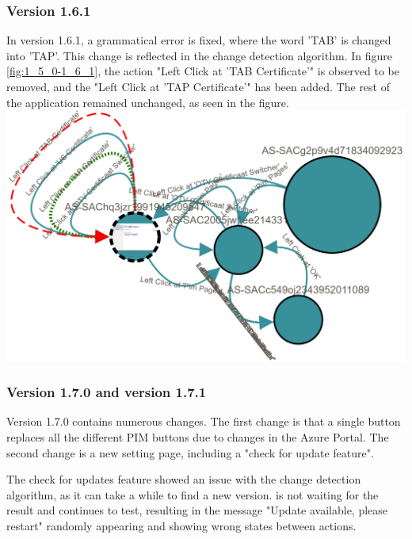 \subsubsection{Version 1.6.1}
In version 1.6.1, a grammatical error is fixed, where the word 'TAB' is changed into 'TAP'. This change is reflected in the change detection algorithm. In figure \ref{fig:1_5_0-1_6_1}, the action "Left Click at 'TAB Certificate'" is observed to be removed, and the "Left Click at 'TAP Certificate'" has been added. The rest of the application remained unchanged, as seen in the figure. \\
\begingroup
\captionsetup{type=figure}
\includegraphics[scale=0.5]{images/6-Experiment/1_5_0-1_6_1.png}
\label{fig:1_5_0-1_6_1}
\endgroup

\subsubsection{Version 1.7.0 and version 1.7.1}
Version 1.7.0 contains numerous changes. The first change is that a single button replaces all the different PIM buttons due to changes in the Azure Portal. The second change is a new setting page, including a "check for update feature".

The check for updates feature showed an issue with the change detection algorithm, as it can take a while to find a new version. \testar is not waiting for the result and continues to test, resulting in the message "Update available, please restart" randomly appearing and showing wrong states between actions. 

